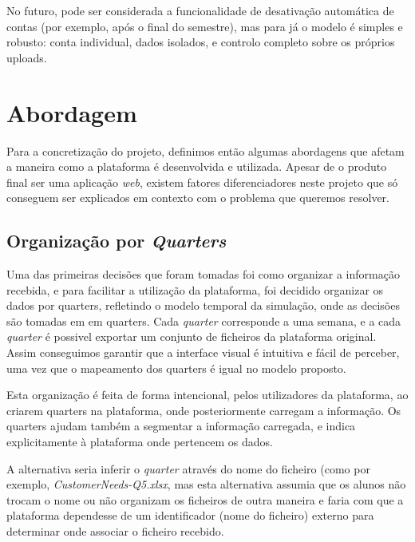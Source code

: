 No futuro, pode ser considerada a funcionalidade de desativação automática de contas (por exemplo, após o final do semestre), mas para já o modelo é simples e robusto: conta individual, dados isolados, e controlo completo sobre os próprios uploads.

\section{Abordagem}
\label{sec:abordagem}

Para a concretização do projeto, definimos então algumas abordagens que afetam a maneira como a plataforma é desenvolvida e utilizada. Apesar de o produto final ser uma aplicação \textit{web}, existem fatores diferenciadores neste projeto que só conseguem ser explicados em contexto com o problema que queremos resolver.
 
\subsection{Organização por \textit{Quarters}}

Uma das primeiras decisões que foram tomadas foi como organizar a informação recebida, e para facilitar a utilização da plataforma,  foi decidido organizar os dados por quarters, refletindo o modelo temporal da simulação, onde as decisões são tomadas em em quarters. Cada \textit{quarter} corresponde a uma semana, e a cada \textit{quarter} é possivel exportar um conjunto de ficheiros da plataforma original.  Assim conseguimos garantir que a interface visual é intuitiva e fácil de perceber, uma vez que o mapeamento dos quarters é igual no modelo proposto. 

Esta organização é feita de forma intencional, pelos utilizadores da plataforma, ao criarem quarters na plataforma, onde posteriormente carregam a informação. Os quarters ajudam também a segmentar a informação carregada, e indica explicitamente à plataforma onde pertencem os dados.

 A alternativa seria inferir o \textit{quarter} através do nome do ficheiro (como por exemplo, \textit{CustomerNeeds-Q5.xlsx}, mas esta alternativa assumia que os alunos não trocam o nome ou não organizam os ficheiros de outra maneira e faria com que a plataforma dependesse de um identificador (nome do ficheiro) externo para determinar onde associar o ficheiro recebido.

